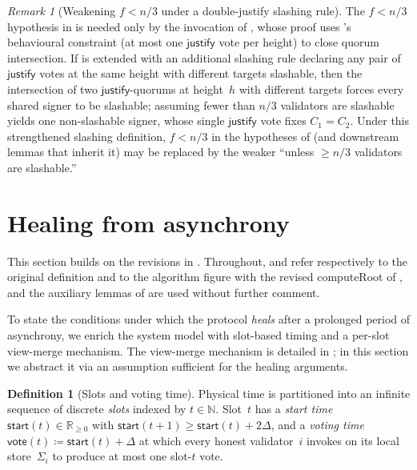 \documentclass{article}
\newcommand{\just}{\ensuremath{\mathsf{justify}}\xspace}
\newcommand{\start}{\mathsf{start}}
\newcommand{\vote}{\mathsf{vote}}
\newcommand{\computeRoot}{\textsf{computeRoot}\xspace}
\theoremstyle{plain}
\theoremstyle{definition}
\newtheorem{definition}[theorem]{Definition}
\theoremstyle{remark}
\newtheorem{remark}[theorem]{Remark}
\begin{document}
\begin{remark}[Weakening $f < n/3$ under a double-justify slashing rule]\label{rev:rem:canonical-fresh-slashable}
The $f < n/3$ hypothesis in  is needed only by the invocation of , whose proof uses 's behavioural constraint (at most one \just vote per height) to close quorum intersection.
If  is extended with an additional slashing rule declaring any pair of \just votes at the same height with different targets slashable, then the intersection of two \just-quorums at height~$h$ with different targets forces every shared signer to be slashable; assuming fewer than $n/3$ validators are slashable yields one non-slashable signer, whose single \just vote fixes $C_1 = C_2$.
Under this strengthened slashing definition, $f < n/3$ in the hypotheses of  (and downstream lemmas that inherit it) may be replaced by the weaker ``unless $\geq n/3$ validators are slashable.''
\end{remark}

\section{Healing from asynchrony}\label{sec:healing}

This section builds on the revisions in .
Throughout,  and  refer respectively to the original definition and to the algorithm figure with the revised \computeRoot of , and the auxiliary lemmas of  are used without further comment.

To state the conditions under which the protocol \emph{heals} after a prolonged period of asynchrony, we enrich the system model with slot-based timing and a per-slot view-merge mechanism.
The view-merge mechanism is detailed in ; in this section we abstract it via an assumption sufficient for the healing arguments.

\begin{definition}[Slots and voting time]\label{rev:def:slots}
Physical time is partitioned into an infinite sequence of discrete \emph{slots} indexed by $t \in \mathbb{N}$.
Slot~$t$ has a \emph{start time} $\start(t) \in \mathbb{R}_{\geq 0}$ with $\start(t+1) \geq \start(t) + 2\Delta$, and a \emph{voting time} $\vote(t) \coloneqq \start(t) + \Delta$ at which every honest validator~$i$ invokes  on its local store~$\Sigma_i$ to produce at most one slot-$t$ vote.
\end{definition}
\end{document}
